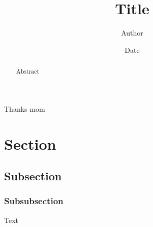 \documentclass{article}
\title{Title}
\author{Author}
\date{Date}
\begin{document}
\maketitle

\begin{acknowledgements}
    Thanks mom
\end{acknowledgements}
\begin{abstract}
    Abstract
\end{abstract}

\section{Section}
\subsection{Subsection}
\subsubsection{Subsubsection}
Text
\end{document}
